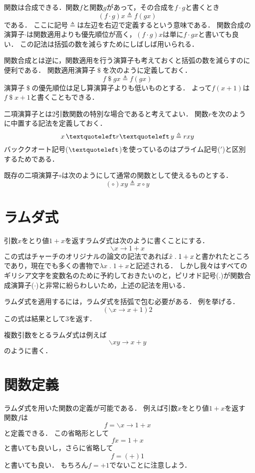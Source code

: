 \documentclass[twocolumn]{jsbook}
\newcommand{\dollar}{\mathop{\$}}
\newcommand{\lambdaperiod}{\;.\;}
\begin{document}
関数は合成できる．関数$f$と関数$g$があって，その合成を$f\cdot g$と書くとき$$(f\cdot g)x\triangleq f(gx)$$である．
ここに記号$\triangleq$は左辺を右辺で定義するという意味である．
関数合成の演算子$\cdot$は関数適用よりも優先順位が高く，$(f\cdot g)x$は単に$f\cdot gx$と書いても良い．
この記法は括弧の数を減らすためにしばしば用いられる．

関数合成とは逆に，関数適用を行う演算子も考えておくと括弧の数を減らすのに便利である．
関数適用演算子$\dollar$を次のように定義しておく．
$$f\dollar gx\triangleq f(gx)$$
演算子$\dollar$の優先順位は足し算演算子よりも低いものとする．
よって$f(x+1)$は$f\dollar x+1$と書くこともできる．

二項演算子とは2引数関数の特別な場合であると考えてよい．
関数$r$を次のように中置する記法を定義しておく．
$$x\,\textquoteleft r\textquoteleft\,y\triangleq rxy$$
バッククオート記号($\textquoteleft$)を使っているのはプライム記号($'$)と区別するためである．

既存の二項演算子$\circ$は次のようにして通常の関数として使えるものとする．
$$(\circ)xy\triangleq x\circ y$$

\section{ラムダ式}

引数$x$をとり値$1+x$を返すラムダ式は次のように書くことにする．
$$\backslash x\rightarrow 1+x$$
この式はチャーチのオリジナルの論文の記法であれば$\Hat x\lambdaperiod 1+x$と書かれたところであり，現在でも多くの書物で$\lambda x\lambdaperiod 1+x$と記述される．
しかし我々はすべてのギリシア文字を変数名のために予約しておきたいのと，ピリオド記号($.$)が関数合成演算子($\cdot$)と非常に紛らわしいため，上述の記法を用いる．

ラムダ式を適用するには，ラムダ式を括弧で包む必要がある．
例を挙げる．
$$\left(\backslash x\rightarrow x+1\right)2$$
この式は結果として$3$を返す．

複数引数をとるラムダ式は例えば$$\backslash xy\rightarrow x+y$$のように書く．

\section{関数定義}

ラムダ式を用いた関数の定義が可能である．
例えば引数$x$をとり値$1+x$を返す関数$f$は$$f=\backslash x\rightarrow 1+x$$と定義できる．
この省略形として$$fx=1+x$$と書いても良いし，さらに省略して$$f=(+)1$$と書いても良い．
もちろん$f=+1$でないことに注意しよう．
\end{document}
